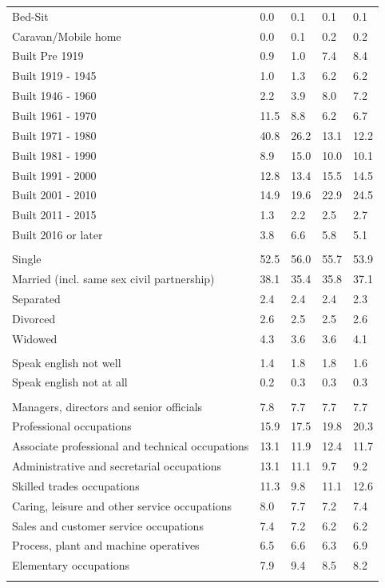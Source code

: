 \documentclass{article}
\begin{document}
\begin{table}[h]
\begin{tabular}{KTTTT}
Bed-Sit & 0.0& 0.1& 0.1& 0.1\\
Caravan/Mobile home & 0.0& 0.1& 0.2& 0.2\\
    \hline
Built Pre 1919 & 0.9& 1.0& 7.4& 8.4\\
Built 1919 - 1945 & 1.0& 1.3& 6.2& 6.2\\
Built  1946 - 1960 & 2.2& 3.9& 8.0& 7.2\\
Built  1961 - 1970 & 11.5&  8.8&  6.2&  6.7\\
Built  1971 - 1980 & 40.8& 26.2& 13.1& 12.2\\
Built  1981 - 1990 &  8.9& 15.0& 10.0& 10.1\\
Built  1991 - 2000 & 12.8& 13.4& 15.5& 14.5\\
Built  2001 - 2010 & 14.9& 19.6& 22.9& 24.5\\
Built  2011 - 2015 & 1.3& 2.2& 2.5& 2.7\\
Built  2016 or later & 3.8& 6.6& 5.8& 5.1\\
\hline
    \\
    \hline
Single & 52.5& 56.0& 55.7& 53.9\\
Married (incl. same sex civil partnership) & 38.1& 35.4& 35.8& 37.1\\
Separated  & 2.4& 2.4& 2.4& 2.3\\
Divorced  & 2.6& 2.5& 2.5& 2.6\\
Widowed & 4.3& 3.6& 3.6& 4.1\\
\hline
    \\ 
    \hline
Speak english not well & 1.4& 1.8& 1.8& 1.6\\
Speak english not at all & 0.2& 0.3& 0.3& 0.3\\
\hline
    \\
    \hline
Managers, directors and senior officials & 7.8& 7.7& 7.7& 7.7\\
Professional occupations & 15.9& 17.5& 19.8& 20.3\\
Associate professional and technical occupations & 13.1& 11.9& 12.4& 11.7\\
Administrative and secretarial occupations & 13.1& 11.1&  9.7&  9.2\\
Skilled trades occupations & 11.3&  9.8& 11.1& 12.6\\
Caring, leisure and other service occupations & 8.0& 7.7& 7.2& 7.4\\
Sales and customer service occupations & 7.4& 7.2& 6.2& 6.2\\
Process, plant and machine operatives & 6.5& 6.6& 6.3& 6.9\\
Elementary occupations & 7.9& 9.4& 8.5& 8.2\\
\hline
\end{tabular}
\end{table}
\end{document}
